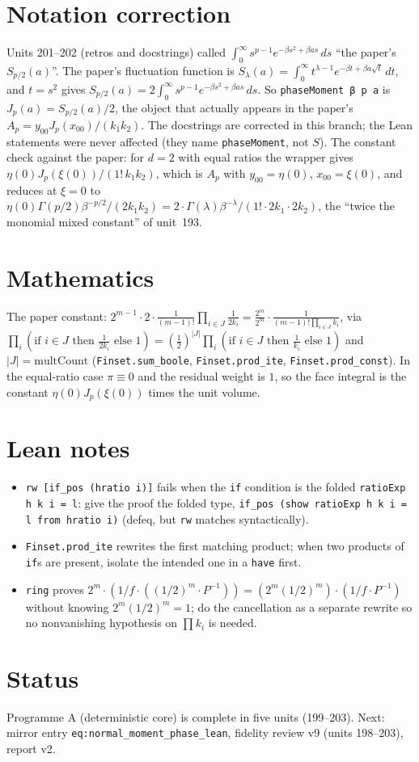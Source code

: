 \documentclass[11pt]{article}
\begin{document}
\section{Notation correction}
Units 201--202 (retros and docstrings) called $\int_0^\infty s^{p-1}e^{-\beta s^2+\beta as}\,ds$
``the paper's $S_{p/2}(a)$''. The paper's fluctuation function is
$S_\lambda(a)=\int_0^\infty t^{\lambda-1}e^{-\beta t+\beta a\sqrt t}\,dt$, and $t=s^2$ gives
$S_{p/2}(a)=2\int_0^\infty s^{p-1}e^{-\beta s^2+\beta as}\,ds$. So \texttt{phaseMoment β p a} is
$J_p(a)=S_{p/2}(a)/2$, the object that actually appears in the paper's
$A_p=y_{00}J_p(x_{00})/(k_1k_2)$. The docstrings are corrected in this branch; the Lean
statements were never affected (they name \texttt{phaseMoment}, not $S$). The constant check
against the paper: for $d=2$ with equal ratios the wrapper gives $\eta(0)J_p(\xi(0))/(1!\,k_1k_2)$,
which is $A_p$ with $y_{00}=\eta(0)$, $x_{00}=\xi(0)$, and reduces at $\xi=0$ to
$\eta(0)\Gamma(p/2)\beta^{-p/2}/(2k_1k_2)=2\cdot\Gamma(\lambda)\beta^{-\lambda}/(1!\cdot2k_1\cdot2k_2)$,
the ``twice the monomial mixed constant'' of unit~193.

\section{Mathematics}
The paper constant: $2^{m-1}\cdot2\cdot\frac{1}{(m-1)!}\prod_{i\in J}\frac1{2k_i}
=\frac{2^m}{2^m}\cdot\frac{1}{(m-1)!\prod_{i\in J}k_i}$, via
$\prod_{i}(\text{if }i\in J\text{ then }\tfrac1{2k_i}\text{ else }1)
=(\tfrac12)^{|J|}\prod_i(\text{if }i\in J\text{ then }\tfrac1{k_i}\text{ else }1)$ and
$|J|=\mathrm{multCount}$ (\texttt{Finset.sum\_boole}, \texttt{Finset.prod\_ite},
\texttt{Finset.prod\_const}). In the equal-ratio case $\pi\equiv0$ and the residual weight is
$1$, so the face integral is the constant $\eta(0)J_p(\xi(0))$ times the unit volume.

\section{Lean notes}
\begin{itemize}
\item \texttt{rw [if\_pos (hratio i)]} fails when the \texttt{if} condition is the folded
  \texttt{ratioExp h k i = l}: give the proof the folded type,
  \texttt{if\_pos (show ratioExp h k i = l from hratio i)} (defeq, but \texttt{rw} matches
  syntactically).
\item \texttt{Finset.prod\_ite} rewrites the first matching product; when two products of
  \texttt{if}s are present, isolate the intended one in a \texttt{have} first.
\item \texttt{ring} proves $2^m\cdot(1/f\cdot((1/2)^m\cdot P^{-1}))=(2^m(1/2)^m)\cdot(1/f\cdot P^{-1})$
  without knowing $2^m(1/2)^m=1$; do the cancellation as a separate rewrite so no nonvanishing
  hypothesis on $\prod k_i$ is needed.
\end{itemize}

\section{Status}
Programme A (deterministic core) is complete in five units (199--203). Next: mirror entry
\texttt{eq:normal\_moment\_phase\_lean}, fidelity review v9 (units 198--203), report v2.
\end{document}
